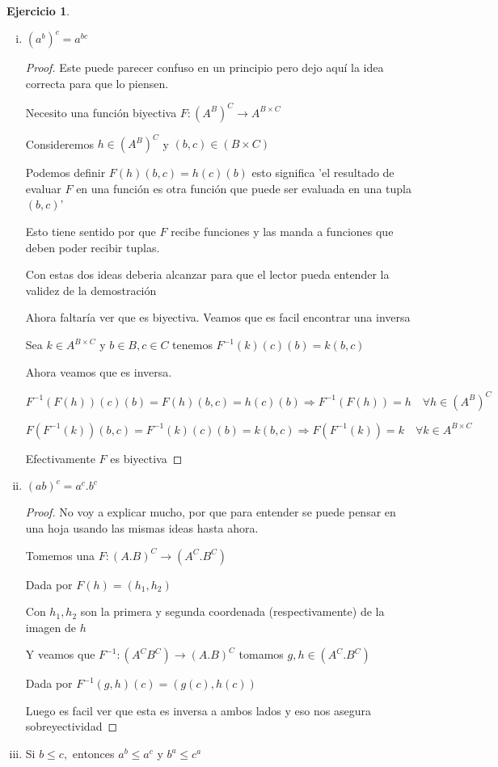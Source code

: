 \documentclass[12pt]{article}
\newcommand{\Ra}{\Rightarrow}
\newcommand{\ra}{\rightarrow}
\theoremstyle{definition}
\newtheorem{ej}{Ejercicio}
\begin{document}
\begin{ej}
\begin{enumerate}[i.]
\begin{proof}
Uniendo todo encontramos $F$ biyectiva
    \end{proof}
  \item $(a^b)^c = a^{bc}$

    \begin{proof}
      Este puede parecer confuso en un principio pero dejo aquí la idea correcta para que lo piensen.

      Necesito una función biyectiva $F: (A^B)^C \ra A^{B \times C}$ 

      Consideremos $h \in (A^B)^C$ y $(b,c) \in (B \times C)$ 

      Podemos definir $F(h)(b,c) = h(c)(b)$ esto significa  'el resultado de evaluar $F$ en una función es otra función que puede ser evaluada en una tupla $(b,c)$'

      Esto tiene sentido por que $F$ recibe funciones y las manda a funciones que deben poder recibir tuplas.

      Con estas dos ideas deberia alcanzar para que el lector pueda entender la validez de la demostración

      Ahora faltaría ver que es biyectiva. Veamos que es facil encontrar una inversa 

      Sea $k \in A^{B \times C}$ y $b \in B, c \in C$ tenemos $ F^{-1}(k)(c)(b) = k(b,c) $

      Ahora veamos que es inversa.

    $F^{-1}(F(h))(c)(b) = F(h)(b,c) = h(c)(b) \Ra F^{-1}(F(h)) = h \quad \forall h \in (A^{B})^C$

      $F(F^{-1}(k))(b,c) = F^{-1}(k)(c)(b) = k(b,c) \Ra F(F^{-1}(k)) = k \quad \forall k \in A^{B \times C}$

      Efectivamente $F$ es biyectiva
    \end{proof}
  \item $(ab)^c = a^c.b^c$
    \begin{proof}
     No voy a explicar mucho, por que para entender se puede pensar en una hoja usando las mismas ideas hasta ahora.

     Tomemos una $F: (A.B)^C \ra (A^C.B^C)$ 

     Dada por $F(h) = (h_{1}, h_{2})$ 

     Con $h_{1},h_{2}$ son la primera y segunda coordenada (respectivamente) de la imagen de $h$

   Y veamos que $F^{-1}: (A^C B^C) \ra (A.B)^C$ tomamos $g,h \in (A^C.B^C)$

     Dada por $F^{-1}(g,h)(c) = (g(c),h(c)) $ 

Luego es facil ver que esta es inversa a ambos lados y eso nos asegura sobreyectividad
    \end{proof}
  \item Si $b \leq c,$ entonces $a^b \leq a^c$ y $b^a \leq c^a$
\end{enumerate}
\end{ej}
\end{document}
